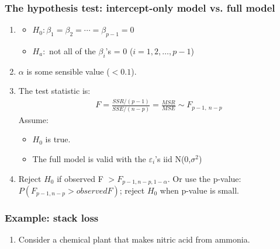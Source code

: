 \documentclass[handout]{beamer}\usepackage[]{graphicx}\usepackage[]{color}
\providecommand{\e}{\varepsilon}
\numberwithin{equation}{section}
\begin{document}
\begin{frame}
\frametitle{The hypothesis test: intercept-only model vs. full model}
\begin{enumerate}[1. ]
\item 
\begin{itemize}
\item $H_0: \beta_1 = \beta_2 = \cdots = \beta_{p-1} = 0$
\pause \item $H_a: $ not all of the $\beta_i$'s = 0 ($i = 1, 2, \ldots, p-1$)
\end{itemize}
\pause \item $\alpha$ is some sensible value ($< 0.1$).
\pause \item The test statistic is:
\pause \begin{align*}
F = \frac{SSR/(p-1)}{SSE/(n-p)} = \frac{MSR}{MSE}  \sim F_{p - 1, \ n - p}
\end{align*}
\pause Assume:
\begin{itemize}
\pause \item $H_0$ is true.
\pause \item The full model is valid with the $\e_i$'s iid N(0,$\sigma^2$)
\end{itemize}
\pause \item Reject $H_0$ if observed F $> F_{p-1, n - p, 1 - \alpha}$. Or use the p-value: $P(F_{p-1, n-p} > observed F)$; reject $H_0$ when p-value is small.
\end{enumerate}
\end{frame}


\begin{frame}
\frametitle{Example: stack loss}
\begin{enumerate}[1. ]
\item Consider a chemical plant that makes nitric acid from ammonia.
\begin{itemize}
\end{itemize}
\end{enumerate}
\end{frame}
\end{document}
